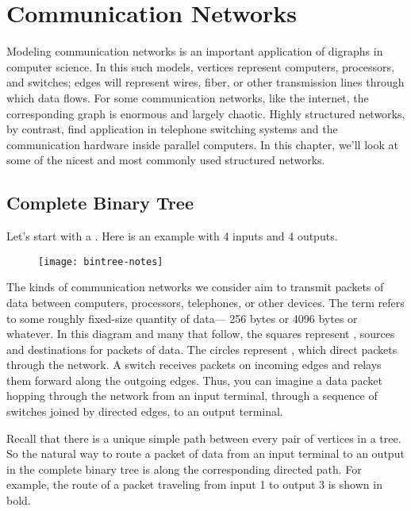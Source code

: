 
\chapter{Communication Networks}\label{comm_net_chap}

Modeling communication networks is an important application of digraphs in
computer science.  In this such models, vertices represent computers,
processors, and switches; edges will represent wires, fiber, or other
transmission lines through which data flows.  For some communication
networks, like the internet, the corresponding graph is enormous and
largely chaotic.  Highly structured networks, by contrast, find
application in telephone switching systems and the communication hardware
inside parallel computers.  In this chapter, we'll look at some of the
nicest and most commonly used structured networks.

\section{Complete Binary Tree}

Let's start with a .  Here is an example
with 4 inputs and 4 outputs.
\begin{figure}
\texttt{[image: bintree-notes]}
\end{figure}
The kinds of communication networks we consider aim to transmit packets of
data between computers, processors, telephones, or other devices.  The
term  refers to some roughly fixed-size quantity of data---
256 bytes or 4096 bytes or whatever.  In this diagram and many that
follow, the squares represent , sources and destinations
for packets of data.  The circles represent , which direct
packets through the network.  A switch receives packets on incoming edges
and relays them forward along the outgoing edges.  Thus, you can imagine a
data packet hopping through the network from an input terminal, through a
sequence of switches joined by directed edges, to an output terminal.

Recall that there is a unique simple path between every pair of vertices
in a tree.  So the natural way to route a packet of data from an input
terminal to an output in the complete binary tree is along the
corresponding directed path.  For example, the route of a packet traveling
from input 1 to output 3 is shown in bold.

